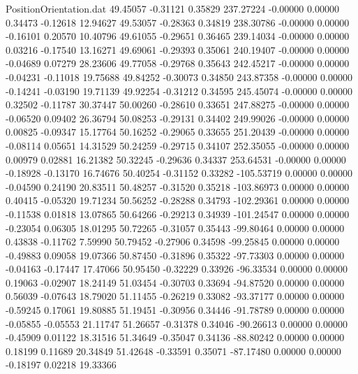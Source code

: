 \begin{filecontents}{PositionOrientation.dat}
  49.45057   -0.31121    0.35829   237.27224   -0.00000    0.00000    0.34473   -0.12618   12.94627
  49.53057   -0.28363    0.34819   238.30786   -0.00000    0.00000   -0.16101    0.20570   10.40796
  49.61055   -0.29651    0.36465   239.14034   -0.00000    0.00000    0.03216   -0.17540   13.16271
  49.69061   -0.29393    0.35061   240.19407   -0.00000    0.00000   -0.04689    0.07279   28.23606
  49.77058   -0.29768    0.35643   242.45217   -0.00000    0.00000   -0.04231   -0.11018   19.75688
  49.84252   -0.30073    0.34850   243.87358   -0.00000    0.00000   -0.14241   -0.03190   19.71139
  49.92254   -0.31212    0.34595   245.45074   -0.00000    0.00000    0.32502   -0.11787   30.37447
  50.00260   -0.28610    0.33651   247.88275   -0.00000    0.00000   -0.06520    0.09402   26.36794
  50.08253   -0.29131    0.34402   249.99026   -0.00000    0.00000    0.00825   -0.09347   15.17764
  50.16252   -0.29065    0.33655   251.20439   -0.00000    0.00000   -0.08114    0.05651   14.31529
  50.24259   -0.29715    0.34107   252.35055   -0.00000    0.00000    0.00979    0.02881   16.21382
  50.32245   -0.29636    0.34337   253.64531   -0.00000    0.00000   -0.18928   -0.13170   16.74676
  50.40254   -0.31152    0.33282  -105.53719    0.00000    0.00000   -0.04590    0.24190   20.83511
  50.48257   -0.31520    0.35218  -103.86973    0.00000    0.00000    0.40415   -0.05320   19.71234
  50.56252   -0.28288    0.34793  -102.29361    0.00000    0.00000   -0.11538    0.01818   13.07865
  50.64266   -0.29213    0.34939  -101.24547    0.00000    0.00000   -0.23054    0.06305   18.01295
  50.72265   -0.31057    0.35443   -99.80464    0.00000    0.00000    0.43838   -0.11762    7.59990
  50.79452   -0.27906    0.34598   -99.25845    0.00000    0.00000   -0.49883    0.09058   19.07366
  50.87450   -0.31896    0.35322   -97.73303    0.00000    0.00000   -0.04163   -0.17447   17.47066
  50.95450   -0.32229    0.33926   -96.33534    0.00000    0.00000    0.19063   -0.02907   18.24149
  51.03454   -0.30703    0.33694   -94.87520    0.00000    0.00000    0.56039   -0.07643   18.79020
  51.11455   -0.26219    0.33082   -93.37177    0.00000    0.00000   -0.59245    0.17061   19.80885
  51.19451   -0.30956    0.34446   -91.78789    0.00000    0.00000   -0.05855   -0.05553   21.11747
  51.26657   -0.31378    0.34046   -90.26613    0.00000    0.00000   -0.45909    0.01122   18.31516
  51.34649   -0.35047    0.34136   -88.80242    0.00000    0.00000    0.18199    0.11689   20.34849
  51.42648   -0.33591    0.35071   -87.17480    0.00000    0.00000   -0.18197    0.02218   19.33366

\end{filecontents}
